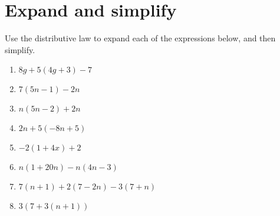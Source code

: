 \documentclass[12pt,letterpaper]{article}
\begin{document}
\section*{Expand and simplify}
Use the distributive law to expand each of the expressions below, and then simplify.
\begin{enumerate}
\item $8g + 5(4g + 3) - 7$

\addvspace{0.7in}

\item $7(5n - 1) - 2n$

\addvspace{0.7in}

\item $n(5n - 2) + 2n$

\addvspace{0.7in}

\item $2n + 5(-8n + 5)$

\addvspace{0.7in}

\item $-2(1 + 4x) + 2$

\addvspace{0.7in}

\item $n(1 + 20n) - n(4n - 3)$

\addvspace{0.7in}

\item $7(n + 1) + 2(7 - 2n) - 3(7 + n)$

\addvspace{1.2in}

\item $3(7 + 3(n + 1))$

\addvspace{1.2in}

\end{enumerate}
\end{document}
